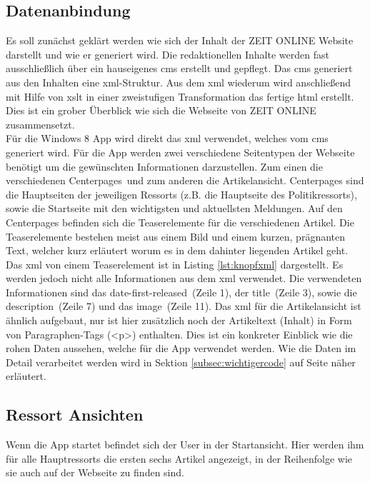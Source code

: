 \documentclass[12pt,a4paper]{scrartcl}
\begin{document}
\subsection{Datenanbindung}
\label{subsec:datenanbindung}
Es soll zunächst geklärt werden wie sich der Inhalt der ZEIT ONLINE Website darstellt und wie er generiert wird. Die redaktionellen Inhalte werden fast ausschließlich über ein hauseigenes \ac{cms} erstellt und gepflegt. Das \ac{cms} generiert aus den Inhalten eine \ac{xml}-Struktur. Aus dem \ac{xml} wiederum wird anschließend mit Hilfe von \ac{xslt} in einer zweistufigen Transformation das fertige \ac{html} erstellt. Dies ist ein grober Überblick wie sich die Webseite von ZEIT ONLINE zusammensetzt.\\
Für die Windows 8 App wird direkt das \ac{xml} verwendet, welches vom \ac{cms} generiert wird. Für die App werden zwei verschiedene Seitentypen der Webseite benötigt um die gewünschten Informationen darzustellen. Zum einen die verschiedenen \glqq Centerpages\grqq\ und zum anderen die Artikelansicht. Centerpages sind die Hauptseiten der jeweiligen Ressorts (z.B. die Hauptseite des Politikressorts), sowie die Startseite mit den wichtigsten und aktuellsten Meldungen. Auf den Centerpages befinden sich die Teaserelemente für die verschiedenen Artikel. Die Teaserelemente bestehen meist aus einem Bild und einem kurzen, prägnanten Text, welcher kurz erläutert worum es in dem dahinter liegenden Artikel geht.\\

Das \ac{xml} von einem Teaserelement ist in Listing \ref{lst:knopfxml} dargestellt. Es werden jedoch nicht alle Informationen aus dem \ac{xml} verwendet. Die verwendeten Informationen sind das \glqq date-first-released\grqq\ (Zeile 1), der \glqq title\grqq\ (Zeile 3), sowie die \glqq description\grqq\ (Zeile 7) und das \glqq image\grqq\ (Zeile 11). Das \ac{xml} für die Artikelansicht ist ähnlich aufgebaut, nur ist hier zusätzlich noch der Artikeltext (Inhalt) in Form von Paragraphen-Tags (<p>) enthalten. Dies ist ein konkreter Einblick wie die rohen Daten aussehen, welche für die App verwendet werden. Wie die Daten im Detail verarbeitet werden wird in Sektion \ref{subsec:wichtigercode} auf Seite \pageref{subsec:wichtigercode} näher erläutert.

\subsection{Ressort Ansichten}
\label{subsec:ressortansichten}
Wenn die App startet befindet sich der User in der Startansicht. Hier werden ihm für alle Hauptressorts die ersten sechs Artikel angezeigt, in der Reihenfolge wie sie auch auf der Webseite zu finden sind. 
\end{document}
